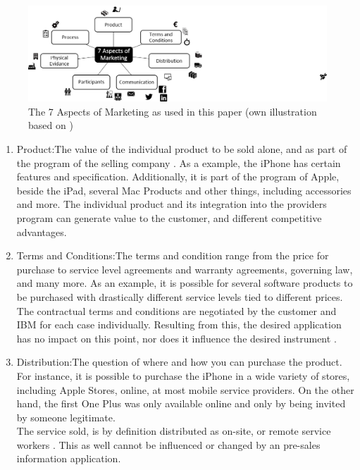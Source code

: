 \begin{figure}[H]
	\includegraphics[width=\textwidth]{img/7p.png}
	\caption[7 Aspects of Marketing]{The 7 Aspects of Marketing as used in this paper (own illustration based on \protect\cites[285]{Thommen.2012}[397-720]{Meffert.2015}{Hoepner2015})}
	\label{fig:aspects}
\end{figure}
\begin{enumerate}
    \item{Product:}The value of the individual product to be sold alone, and as part of the program of the selling company \parencite[cf.][398]{Meffert.2015}. As a example, the iPhone has certain features and specification. Additionally, it is part of the program of Apple, beside the iPad, several Mac Products and other things, including accessories and more. The individual product and its integration into the providers program can generate value to the customer, and different competitive advantages.
    \item{Terms and Conditions:}The terms and condition range from the price for purchase to service level agreements and warranty agreements, governing law, and many more. As an example, it is possible for several software products to be purchased with drastically different service levels tied to different prices. \\
    The contractual terms and conditions are negotiated by the customer and IBM for each case individually. Resulting from this, the desired application has no impact on this point, nor does it influence the desired instrument \parencite[cf.][]{Sachs.20.04.2017}.
    \item{Distribution:}The question of where and how you can purchase the product. For instance, it is possible to purchase the iPhone in a wide variety of stores, including Apple Stores, online, at most mobile service providers. On the other hand, the first One Plus was only available online and only by being invited by someone legitimate.\\
    The service sold, is by definition distributed as on-site, or remote service workers \parencite[cf.][]{Sachs.20.04.2017}. This as well cannot be influenced or changed by an pre-sales information application.

\end{enumerate}
